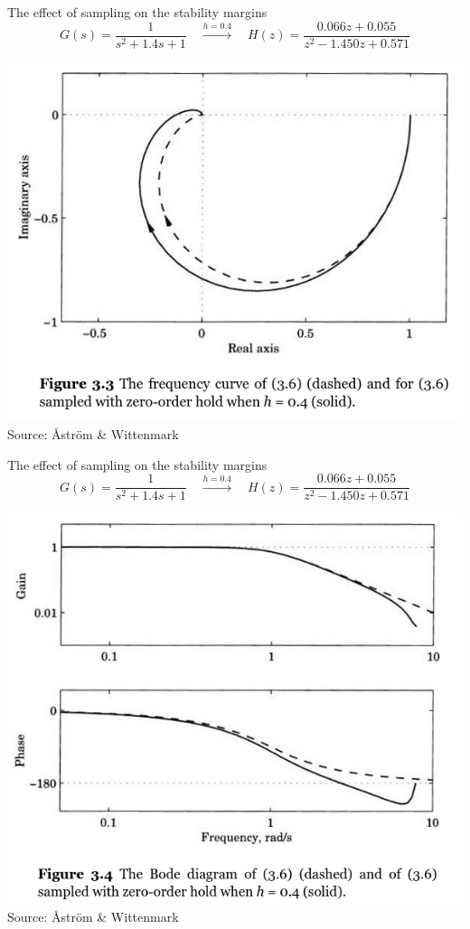 \documentclass[presentation,aspectratio=169]{beamer}
\begin{document}
\begin{frame}[label={sec:org9f31edf}]{The effect of sampling on the stability margins}
\[G(s) = \frac{1}{s^2 + 1.4s + 1} \quad \overset{h=0.4}{\longrightarrow} \quad H(z) = \frac{0.066z + 0.055}{z^2 - 1.450z + 0.571}\] 
\begin{center}
\includegraphics[width=0.5\linewidth]{../../figures/fig3-3.png}
\tiny Source: Åström \& Wittenmark
\end{center}
\end{frame}

\begin{frame}[label={sec:org2940ec7}]{The effect of sampling on the stability margins}
\[G(s) = \frac{1}{s^2 + 1.4s + 1} \quad \overset{h=0.4}{\longrightarrow} \quad H(z) = \frac{0.066z + 0.055}{z^2 - 1.450z + 0.571}\] 

\begin{center}
\includegraphics[width=0.5\linewidth]{../../figures/fig3-4.png}
\tiny Source: Åström \& Wittenmark
\end{center}
\end{frame}
\end{document}
